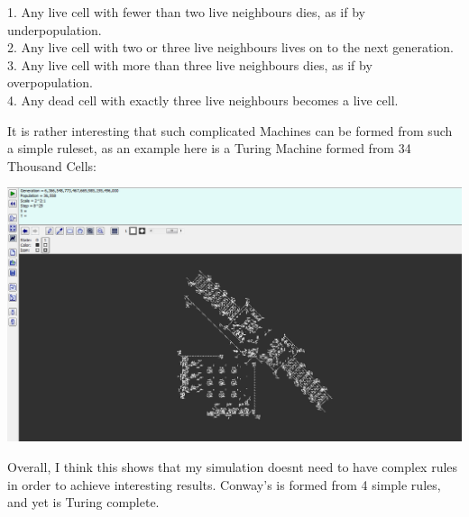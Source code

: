 \begin{flushleft}
\begin{enumerate}
\begin{enumerate}
\begin{enumerate}
                            
                            \begin{center}
                                \normalsize
                                1. Any live cell with fewer than two live neighbours dies, as if by underpopulation. \\
                                2. Any live cell with two or three live neighbours lives on to the next generation. \\
                                3. Any live cell with more than three live neighbours dies, as if by overpopulation. \\
                                4. Any dead cell with exactly three live neighbours becomes a live cell. \\
                            \end{center}

                            \vspace{0.2cm}
                            It is rather interesting that such complicated Machines can be formed from such a simple ruleset, as an example here is a Turing Machine
                            formed from 34 Thousand Cells: \\

                            \vspace{0.5cm}
                            \centerline{\includegraphics[width=14cm]{Images/InitialResearch/ConwaysTuringMachine.png}}
                            \vspace{0.2cm}

                            Overall, I think this shows that my simulation doesnt need to have complex rules in order to achieve interesting results. Conway's is formed
                            from 4 simple rules, and yet is Turing complete.


\end{enumerate}
\end{enumerate}
\end{enumerate}
\end{flushleft}
